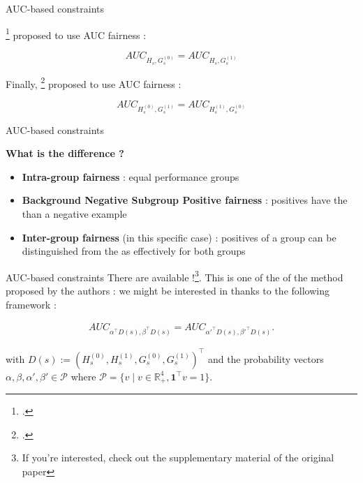 \begin{frame}{AUC-based constraints}

    
    \citeauthor{borkan2019nuanced}\footcite{borkan2019nuanced} proposed to use  AUC fairness :

    \begin{equation}
        AUC_{H_s,G_s^{(0)}} = AUC_{H_s,G_s^{(1)}}
    \end{equation}
    
    Finally, \citeauthor{kallus2019fairness}\footcite{kallus2019fairness} proposed to use  AUC fairness :

    \begin{equation}
        AUC_{H_s^{(0)},G_s^{(1)}} = AUC_{H_s^{(1)},G_s^{(0)}}
    \end{equation}

\end{frame}
    

\begin{frame}{AUC-based constraints}


    {\large\textbf{What is the difference ?}}
    \begin{itemize}
        \item \textbf{Intra-group fairness} : equal performance  groups
        \item \textbf{Background Negative Subgroup Positive fairness} : positives  have the  than a negative example
        \item \textbf{Inter-group fairness} (in this specific case) : positives of a group can be distinguished from the  as effectively for both groups
    \end{itemize}


\end{frame}


\begin{frame}{AUC-based constraints}
    There are  available !\footnote{If you're interested, check out the supplementary material of the original paper}. This is one of the  of the method proposed by the authors :  we might be interested in thanks to the following framework :

    \begin{align} \label{eq:auc-based-constraints-general}
        AUC_{\alpha^\top D(s), \beta^\top D(s)} = AUC_{\alpha'^\top D(s),
        \beta'^\top D(s)}.
    \end{align}

    with $ D(s) := (H^{(0)}_s, H^{(1)}_s, G^{(0)}_s, G^{(1)}_s)^\top$ and the probability vectors $\alpha, \beta, \alpha', \beta' \in  \mathcal{P}$ where $\mathcal{P} = \{ v \mid v \in \mathbb{R}_+^4, \mathbf{1}^\top v = 1 \}$.

\end{frame}


